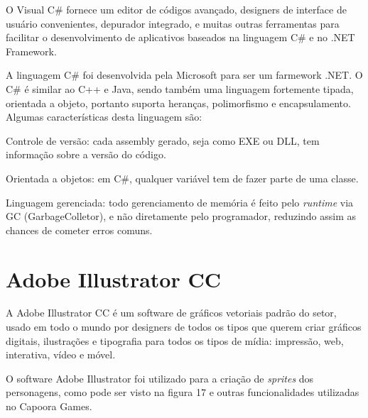 O Visual C\# fornece um editor de códigos avançado, designers de interface de usuário convenientes, depurador integrado, e muitas outras ferramentas para facilitar o desenvolvimento de aplicativos baseados na linguagem C\# e no .NET Framework. 

A linguagem C\# foi desenvolvida pela Microsoft para ser um farmework .NET. 
O C\# é similar ao C++ e Java, sendo também uma linguagem fortemente tipada, orientada a objeto, portanto suporta heranças, polimorfismo e encapsulamento. 
Algumas características desta linguagem são: 

\begin{alineascomponto}
	\item Controle de versão: cada assembly gerado, seja como EXE ou DLL, tem informação sobre a versão do código. 

	\item Orientada a objetos: em C\#, qualquer variável tem de fazer parte de uma classe.  

	\item Linguagem gerenciada: todo gerenciamento de memória é feito pelo \textit{runtime} via GC (GarbageColletor), e não diretamente pelo programador, reduzindo assim as chances de cometer erros comuns.
\end{alineascomponto}
\cite{mcs}

\section{Adobe Illustrator CC}
\label{sec:Adobe-Illustrato-CC}

A Adobe Illustrator CC é um software de gráficos vetoriais padrão do setor, usado em todo o mundo por designers de todos os tipos que querem criar gráficos digitais, ilustrações e tipografia para todos os tipos de mídia: impressão, web, interativa, vídeo e móvel. \cite{adb}

O software Adobe Illustrator foi utilizado para a criação de \textit{sprites} dos personagens, como pode ser visto na figura 17 e outras funcionalidades utilizadas no Capoora Games.

\begin{figure}[h!]
		\centering
	\end{figure}
	

